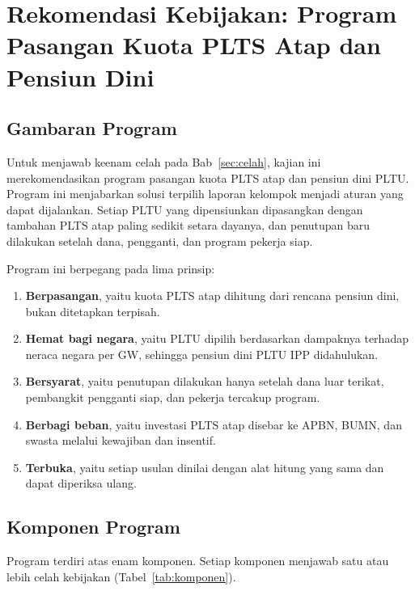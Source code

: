 \section{Rekomendasi Kebijakan: Program Pasangan Kuota PLTS Atap dan Pensiun Dini}
\label{sec:rekomendasi}

\subsection{Gambaran Program}

Untuk menjawab keenam celah pada Bab~\ref{sec:celah}, kajian ini merekomendasikan program pasangan kuota PLTS atap dan pensiun dini PLTU. Program ini menjabarkan solusi terpilih laporan kelompok menjadi aturan yang dapat dijalankan. Setiap PLTU yang dipensiunkan dipasangkan dengan tambahan PLTS atap paling sedikit setara dayanya, dan penutupan baru dilakukan setelah dana, pengganti, dan program pekerja siap.

Program ini berpegang pada lima prinsip:
\begin{enumerate}
  \item \textbf{Berpasangan}, yaitu kuota PLTS atap dihitung dari rencana pensiun dini, bukan ditetapkan terpisah.
  \item \textbf{Hemat bagi negara}, yaitu PLTU dipilih berdasarkan dampaknya terhadap neraca negara per GW, sehingga pensiun dini PLTU IPP didahulukan.
  \item \textbf{Bersyarat}, yaitu penutupan dilakukan hanya setelah dana luar terikat, pembangkit pengganti siap, dan pekerja tercakup program.
  \item \textbf{Berbagi beban}, yaitu investasi PLTS atap disebar ke APBN, BUMN, dan swasta melalui kewajiban dan insentif.
  \item \textbf{Terbuka}, yaitu setiap usulan dinilai dengan alat hitung yang sama dan dapat diperiksa ulang.
\end{enumerate}

\subsection{Komponen Program}

Program terdiri atas enam komponen. Setiap komponen menjawab satu atau lebih celah kebijakan (Tabel~\ref{tab:komponen}).

